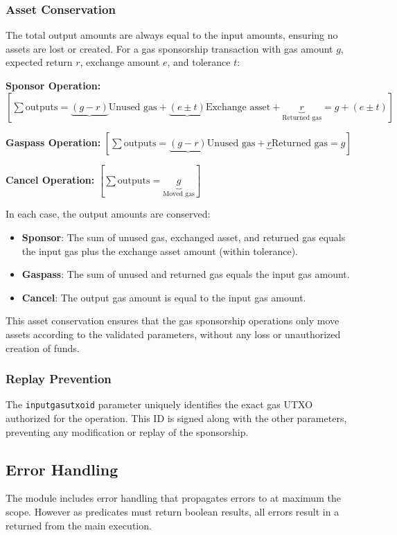 \subsubsection{Asset Conservation}
The total output amounts are always equal to the input amounts, ensuring no assets are lost or created.
For a gas sponsorship transaction with gas amount $g$, expected return $r$, exchange amount $e$, and tolerance $t$:

\textbf{Sponsor Operation:}
$[ \sum \text{outputs} = \underbrace{(g - r)}{\text{Unused gas}} + \underbrace{(e \pm t)}{\text{Exchange asset}} + \underbrace{r}_{\text{Returned gas}} = g + (e \pm t) ]$

\textbf{Gaspass Operation:}
$[ \sum \text{outputs} = \underbrace{(g - r)}{\text{Unused gas}} + \underbrace{r}{\text{Returned gas}} = g ]$

\textbf{Cancel Operation:}
$[ \sum \text{outputs} = \underbrace{g}_{\text{Moved gas}} ]$

In each case, the output amounts are conserved:
\begin{itemize}
\item \textbf{Sponsor}: The sum of unused gas, exchanged asset, and returned gas equals the input gas plus the exchange asset amount (within tolerance).
\item \textbf{Gaspass}: The sum of unused and returned gas equals the input gas amount.
\item \textbf{Cancel}: The output gas amount is equal to the input gas amount.
\end{itemize}

This asset conservation ensures that the gas sponsorship operations only move assets according to the validated parameters, without any loss or unauthorized creation of funds.






















\subsubsection{Replay Prevention}
The \texttt{inputgasutxoid} parameter uniquely identifies the exact gas UTXO authorized for the operation.
This ID is signed along with the other parameters, preventing any modification or replay of the sponsorship.


\subsection{Error Handling}
The module includes error handling that propagates errors to at maximum the  scope. However as predicates
must return boolean results, all errors result in a  returned from the main execution.



